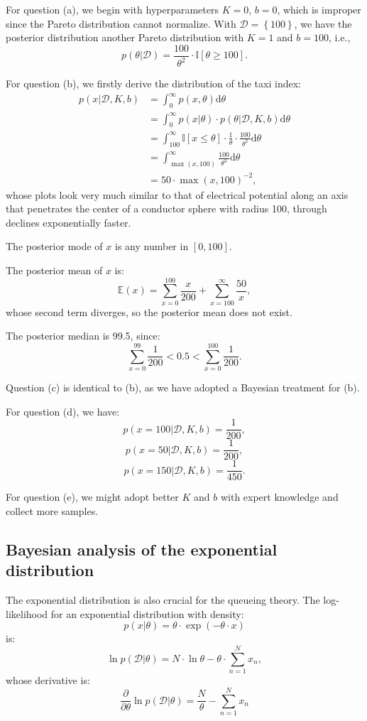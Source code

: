 \documentclass[UTF8]{ctexart}
\begin{document}
For question (a), we begin with hyperparameters $K=0$, $b=0$, which is improper since the Pareto distribution cannot normalize.
With $\mathcal{D}=\left\{100\right\}$, we have the posterior distribution another Pareto distribution with $K=1$ and $b=100$, i.e.,
$$p(\theta|\mathcal{D})=\frac{100}{\theta^{2}}\cdot\mathbb{I}[\theta\geq 100].$$

For question (b), we firstly derive the distribution of the taxi index:
$$
\begin{aligned}
p(x|\mathcal{D},K,b)&=\int_{0}^{\infty}p(x,\theta)\text{d}\theta\\
&=\int_{0}^{\infty}p(x|\theta)\cdot p(\theta|\mathcal{D},K,b)\text{d}\theta\\
&=\int_{100}^{\infty}\mathbb{I}[x\leq\theta]\cdot\frac{1}{\theta}\cdot\frac{100}{\theta^{2}}\text{d}\theta\\
&=\int_{\max(x,100)}^{\infty}\frac{100}{\theta^{3}}\text{d}\theta\\
&=50\cdot\max(x,100)^{-2},
\end{aligned}
$$
whose plots look very much similar to that of electrical potential along an axis that penetrates the center of a conductor sphere with radius 100, through declines exponentially faster.

The posterior mode of $x$ is any number in $[0,100]$.

The posterior mean of $x$ is:
$$\mathbb{E}(x)=\sum_{x=0}^{100}\frac{x}{200}+\sum_{x=100}^{\infty}\frac{50}{x},$$
whose second term diverges, so the posterior mean does not exist.

The posterior median is 99.5, since:
$$\sum_{x=0}^{99}\frac{1}{200}<0.5<\sum_{x=0}^{100}\frac{1}{200}.$$

Question (c) is identical to (b), as we have adopted a Bayesian treatment for (b).

For question (d), we have:
$$p(x=100|\mathcal{D},K,b)=\frac{1}{200},$$
$$p(x=50|\mathcal{D},K,b)=\frac{1}{200},$$
$$p(x=150|\mathcal{D},K,b)=\frac{1}{450}.$$

For question (e), we might adopt better $K$ and $b$ with expert knowledge and collect more samples.

\subsection{Bayesian analysis of the exponential distribution}
The exponential distribution is also crucial for the queueing theory.
The log-likelihood for an exponential distribution with density:
$$p(x|\theta)=\theta\cdot \exp(-\theta\cdot x)$$
is:
$$\ln p(\mathcal{D}|\theta) = N\cdot\ln \theta - \theta\cdot \sum_{n=1}^{N}x_{n},$$
whose derivative is:
$$\frac{\partial}{\partial \theta} \ln p(\mathcal{D}|\theta) = \frac{N}{\theta} - \sum_{n=1}^{N}x_{n}$$
\end{document}
